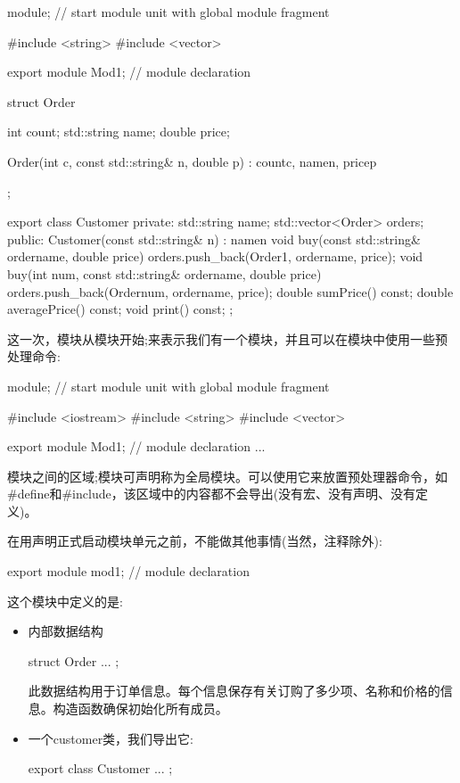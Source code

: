 \begin{cpp}
module; // start module unit with global module fragment

#include <string>
#include <vector>

export module Mod1; // module declaration

struct Order {
	int count;
	std::string name;
	double price;
	
	Order(int c, const std::string& n, double p)
	: count{c}, name{n}, price{p} {
	}
};

export class Customer {
private:
	std::string name;
	std::vector<Order> orders;
public:
	Customer(const std::string& n)
	: name{n} {
	}
	void buy(const std::string& ordername, double price) {
		orders.push_back(Order{1, ordername, price});
	}
	void buy(int num, const std::string& ordername, double price) {
		orders.push_back(Order{num, ordername, price});
	}
	double sumPrice() const;
	double averagePrice() const;
	void print() const;
};
\end{cpp}

这一次，模块从模块开始;来表示我们有一个模块，并且可以在模块中使用一些预处理命令:

\begin{cpp}
module; // start module unit with global module fragment

#include <iostream>
#include <string>
#include <vector>

export module Mod1; // module declaration
...
\end{cpp}

模块之间的区域;模块可声明称为全局模块。可以使用它来放置预处理器命令，如\#define和\#include，该区域中的内容都不会导出(没有宏、没有声明、没有定义)。

在用声明正式启动模块单元之前，不能做其他事情(当然，注释除外):

\begin{cpp}
export module mod1; // module declaration
\end{cpp}

这个模块中定义的是:

\begin{itemize}
\item 
内部数据结构

\begin{cpp}
struct Order {
	...
};
\end{cpp}

此数据结构用于订单信息。每个信息保存有关订购了多少项、名称和价格的信息。构造函数确保初始化所有成员。

\item 
一个customer类，我们导出它:

\begin{cpp}
export class Customer {
	...
};
\end{cpp}
\end{itemize}


